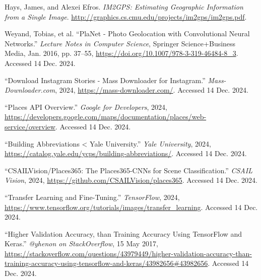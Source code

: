 \documentclass[letterpaper]{article} %
\begin{document}
\begin{thebibliography}{99}

Hays, James, and Alexei Efros. \textit{IM2GPS: Estimating Geographic Information from a Single Image}. \url{http://graphics.cs.cmu.edu/projects/im2gps/im2gps.pdf}.

Weyand, Tobias, et al. “PlaNet - Photo Geolocation with Convolutional Neural Networks.” \textit{Lecture Notes in Computer Science}, Springer Science+Business Media, Jan. 2016, pp. 37–55, \url{https://doi.org/10.1007/978-3-319-46484-8_3}. Accessed 14 Dec. 2024.

“Download Instagram Stories - Mass Downloader for Instagram.” \textit{Mass-Downloader.com}, 2024, \url{https://mass-downloader.com/}. Accessed 14 Dec. 2024.

“Places API Overview.” \textit{Google for Developers}, 2024, \url{https://developers.google.com/maps/documentation/places/web-service/overview}. Accessed 14 Dec. 2024.

“Building Abbreviations < Yale University.” \textit{Yale University}, 2024, \url{https://catalog.yale.edu/ycps/building-abbreviations/}. Accessed 14 Dec. 2024.

“CSAILVision/Places365: The Places365-CNNs for Scene Classification.” \textit{CSAIL Vision}, 2024, \url{https://github.com/CSAILVision/places365}. Accessed 14 Dec. 2024.

“Transfer Learning and Fine-Tuning.” \textit{TensorFlow}, 2024, \url{https://www.tensorflow.org/tutorials/images/transfer_learning}. Accessed 14 Dec. 2024.

“Higher Validation Accuracy, than Training Accuracy Using TensorFlow and Keras.” \textit{@yhenon on StackOverflow}, 15 May 2017, \url{https://stackoverflow.com/questions/43979449/higher-validation-accuracy-than-training-accuracy-using-tensorflow-and-keras/43982656#43982656}. Accessed 14 Dec. 2024.

\end{thebibliography}

‌
‌
\end{document}

